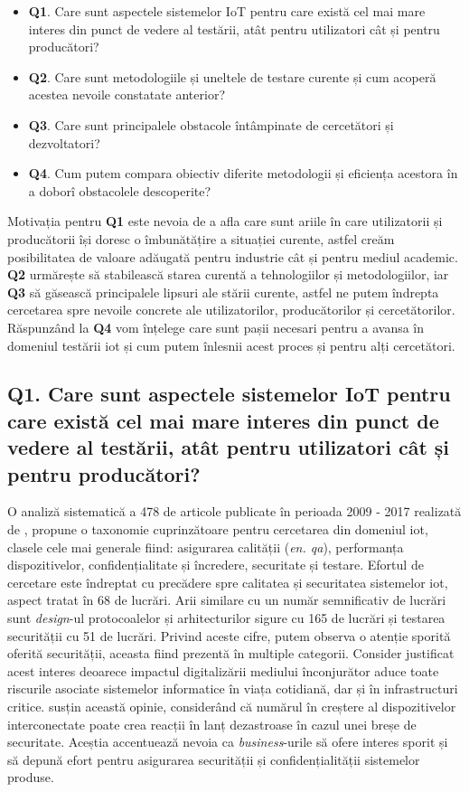 \begin{itemize}
    \item[] \textbf{Q1}. Care sunt aspectele sistemelor IoT pentru care există cel mai mare interes din punct de vedere al testării, atât pentru utilizatori cât și pentru producători?
    \item[] \textbf{Q2}. Care sunt metodologiile și uneltele de testare curente și cum acoperă acestea nevoile constatate anterior?
    \item[] \textbf{Q3}. Care sunt principalele obstacole întâmpinate de cercetători și dezvoltatori?
    \item[] \textbf{Q4}. Cum putem compara obiectiv diferite metodologii și eficiența acestora în a doborî obstacolele descoperite?
\end{itemize}

Motivația pentru \textbf{Q1} este nevoia de a afla care sunt ariile în care utilizatorii și producătorii își doresc o îmbunătățire a situației curente, astfel creăm posibilitatea de valoare adăugată pentru industrie cât și pentru mediul academic. \textbf{Q2} urmărește să stabilească starea curentă a tehnologiilor și metodologiilor, iar \textbf{Q3} să găsească principalele lipsuri ale stării curente, astfel ne putem îndrepta cercetarea spre nevoile concrete ale utilizatorilor, producătorilor și cercetătorilor. Răspunzând la \textbf{Q4} vom înțelege care sunt pașii necesari pentru a avansa în domeniul testării \acrshort{iot} și cum putem înlesnii acest proces și pentru alți cercetători. 

\subsection*{Q1. Care sunt aspectele sistemelor IoT pentru care există cel mai mare interes din punct de vedere al testării, atât pentru utilizatori cât și pentru producători?}

O analiză sistematică a 478 de articole publicate în perioada 2009 - 2017 realizată de \citet{Ahmed2019}, propune o taxonomie cuprinzătoare pentru cercetarea din domeniul \acrshort{iot}, clasele cele mai generale fiind: asigurarea calității (\textit{en. \acrlong{qa}}), performanța dispozitivelor, confidențialitate și încredere, securitate și testare. Efortul de cercetare este îndreptat cu precădere spre calitatea și securitatea sistemelor \acrshort{iot}, aspect tratat în 68 de lucrări. Arii similare cu un număr semnificativ de lucrări sunt \textit{design}-ul protocoalelor și arhitecturilor sigure cu 165 de lucrări și testarea securității cu 51 de lucrări. Privind aceste cifre, putem observa o atenție sporită oferită securității, aceasta fiind prezentă în multiple categorii. Consider justificat acest interes deoarece impactul digitalizării mediului înconjurător aduce toate riscurile asociate sistemelor informatice în viața cotidiană, dar și în infrastructuri critice. \citet{Lee2015} susțin această opinie, considerând că numărul în creștere al dispozitivelor interconectate poate crea reacții în lanț dezastroase în cazul unei breșe de securitate. Aceștia accentuează nevoia ca \textit{business}-urile să ofere interes sporit și să depună efort pentru asigurarea securității și confidențialității sistemelor produse.

